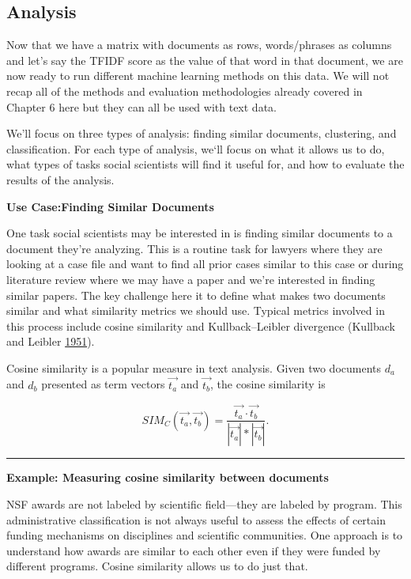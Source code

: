 \documentclass[]{krantz}
\begin{document}
\subsection{Analysis}\label{analysis}

Now that we have a matrix with documents as rows, words/phrases as
columns and let's say the TFIDF score as the value of that word in that
document, we are now ready to run different machine learning methods on
this data. We will not recap all of the methods and evaluation
methodologies already covered in Chapter 6 here but they can all be used
with text data.

We'll focus on three types of analysis: finding similar documents,
clustering, and classification. For each type of analysis, we`ll focus
on what it allows us to do, what types of tasks social scientists will
find it useful for, and how to evaluate the results of the analysis.

\textbf{Use Case:Finding Similar Documents}

One task social scientists may be interested in is finding similar
documents to a document they're analyzing. This is a routine task for
lawyers where they are looking at a case file and want to find all prior
cases similar to this case or during literature review where we may have
a paper and we're interested in finding similar papers. The key
challenge here it to define what makes two documents similar and what
similarity metrics we should use. Typical metrics involved in this
process include cosine similarity and Kullback--Leibler divergence
(Kullback and Leibler
\protect\hyperlink{ref-kullback1951information}{1951}).

Cosine similarity is a popular measure in text analysis. Given two
documents \(d_a\) and \(d_b\) presented as term vectors
\(\overrightarrow{t_a}\) and \(\overrightarrow{t_b}\), the cosine
similarity is

\[SIM_C(\overrightarrow{t_a},\overrightarrow{t_b}) = \frac{\overrightarrow{t_a} \cdot
     \overrightarrow{t_b}}{|\overrightarrow{t_a}|*|\overrightarrow{t_b}|}.\]

\begin{center}\rule{0.5\linewidth}{\linethickness}\end{center}

\textbf{Example: Measuring cosine similarity between documents}

NSF awards are not labeled by scientific field---they are labeled by
program. This administrative classification is not always useful to
assess the effects of certain funding mechanisms on disciplines and
scientific communities. One approach is to understand how awards are
similar to each other even if they were funded by different programs.
Cosine similarity allows us to do just that.
\end{document}

